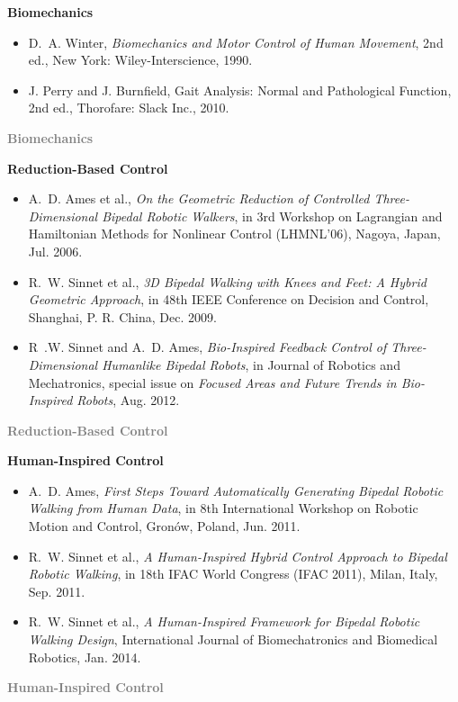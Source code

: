 \begin{frame}[t]
   {
    {\Large \bf Biomechanics}
    \begin{itemize}
    \item
      D.~A. Winter, {\em Biomechanics and Motor Control of Human Movement}, 2nd ed., New York: Wiley-Interscience, 1990.\\
    \item
      J. Perry and J. Burnfield, Gait Analysis: Normal and Pathological Function, 2nd ed., Thorofare: Slack Inc., 2010.\\
    \end{itemize}
  }
   {
    \textcolor{gray}{\Large \bf Biomechanics}\\[1mm]
  }

   {
    {\Large \bf Reduction-Based Control}
    \begin{itemize}
    \item
      A.~D. Ames et al., {\em On the Geometric Reduction of Controlled Three-Dimensional Bipedal Robotic Walkers}, in 3rd Workshop on Lagrangian and Hamiltonian Methods for Nonlinear Control (LHMNL'06), Nagoya, Japan, Jul. 2006.\\
    \item
      R.~W. Sinnet et al., {\em 3D Bipedal Walking with Knees and Feet: A Hybrid Geometric Approach}, in 48th IEEE Conference on Decision and Control, Shanghai, P. R. China, Dec. 2009.
    \item
      R~.W. Sinnet and A.~D. Ames, {\em Bio-Inspired Feedback Control of Three-Dimensional Humanlike Bipedal Robots}, in Journal of Robotics and Mechatronics, special issue on {\em Focused Areas and Future Trends in Bio-Inspired Robots}, Aug. 2012.

    \end{itemize}
  }
   {
    \textcolor{gray}{\Large \bf Reduction-Based Control}\\[1mm]
  }

   {
    {\Large \bf Human-Inspired Control}
    \begin{itemize}
    \item
      A.~D. Ames, {\em First Steps Toward Automatically Generating Bipedal Robotic Walking from Human Data}, in 8th International Workshop on Robotic Motion and Control, Gron{\'o}w, Poland, Jun. 2011.
    \item
      R.~W. Sinnet et al., {\em A Human-Inspired Hybrid Control Approach to Bipedal Robotic Walking}, in 18th IFAC World Congress (IFAC 2011), Milan, Italy, Sep. 2011.
    \item
      R.~W. Sinnet et al., {\em A Human-Inspired Framework for Bipedal Robotic Walking Design}, International Journal of Biomechatronics and Biomedical Robotics, Jan. 2014.
    \end{itemize}
  }
   {
    \textcolor{gray}{\Large \bf Human-Inspired Control}
  }

\end{frame}

